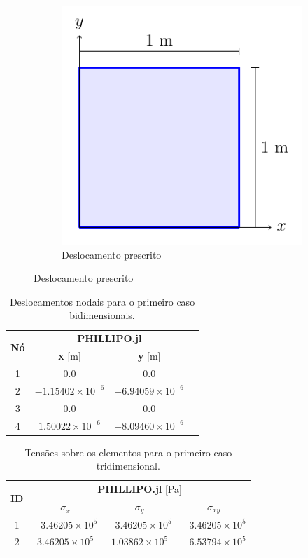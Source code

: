 \begin{figure}
\begin{subfigure}[b]{0.45\textwidth}
        \includegraphics[page=5]{Figuras/verificacao_quadrado.pdf}
        \caption{Deslocamento prescrito}
        \label{fig:verificacao_quadrado_5}
    \end{subfigure}
\end{figure}


\begin{table}
    \centering
    \caption{Deslocamentos nodais para o primeiro caso bidimensionais.}
    \begin{tabular}{c | c c c }
        \toprule
        \multirow{2}{*}{\textbf{Nó}} & \multicolumn{2}{c}{\textbf{PHILLIPO.jl}}  \\
                                     & \textbf{x} [m] & \textbf{y} [m] \\                            
        \midrule
        1 & 0.0 & 0.0 \\
        2 & $-1.15402\times10^{-6}$ & $-6.94059\times10^{-6}$ \\
        3 & 0.0 & 0.0 \\
        4 & $1.50022\times10^{-6}$ & $-8.09460\times10^{-6}$ \\
        \bottomrule
    \end{tabular}
    \label{tab:verificacao_quadrado_1_deslocamentos}
\end{table}

\begin{table}
    \centering
    \caption{Tensões sobre os elementos para o primeiro caso tridimensional.}
    \begin{tabular}{c | c c c}
        \toprule
        \multirow{2}{*}{\textbf{ID}} & \multicolumn{3}{c}{\textbf{PHILLIPO.jl} [Pa]}  \\
                                           & \textbf{$\sigma_x$} & \textbf{$\sigma_y$} & \textbf{$\sigma_{xy}$} \\                            
        \midrule
        1 & $-3.46205\times10^{5}$ & $-3.46205\times10^{5}$ & $-3.46205\times10^{5}$ \\
        2 & $3.46205\times10^{5}$ & $1.03862\times10^{5}$ & $-6.53794\times10^{5}$ \\
        \bottomrule
    \end{tabular}
    \label{tab:verificacao_quadrado_1_tensoes}
\end{table}


